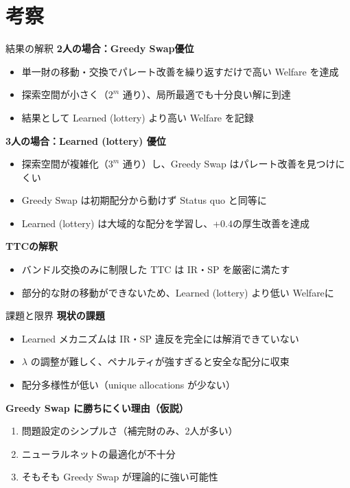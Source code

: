 \documentclass[aspectratio=169,12pt]{beamer}
\begin{document}
\section{考察}

\begin{frame}{結果の解釈}
\textbf{2人の場合：Greedy Swap優位}
\begin{itemize}
    \item 単一財の移動・交換でパレート改善を繰り返すだけで高い Welfare を達成
    \item 探索空間が小さく（$2^m$ 通り）、局所最適でも十分良い解に到達
    \item 結果として Learned (lottery) より高い Welfare を記録
\end{itemize}

\vspace{0.5cm}
\textbf{3人の場合：Learned (lottery) 優位}
\begin{itemize}
    \item 探索空間が複雑化（$3^m$ 通り）し、Greedy Swap はパレート改善を見つけにくい
    \item Greedy Swap は初期配分から動けず Status quo と同等に
    \item Learned (lottery) は大域的な配分を学習し、+0.4の厚生改善を達成
\end{itemize}

\vspace{0.5cm}
\textbf{TTCの解釈}
\begin{itemize}
    \item バンドル交換のみに制限した TTC は IR・SP を厳密に満たす
    \item 部分的な財の移動ができないため、Learned (lottery) より低い Welfareに
\end{itemize}
\end{frame}

\begin{frame}{課題と限界}
\textbf{現状の課題}
\begin{itemize}
    \item Learned メカニズムは IR・SP 違反を完全には解消できていない
    \item $\lambda$ の調整が難しく、ペナルティが強すぎると安全な配分に収束
    \item 配分多様性が低い（unique allocations が少ない）
\end{itemize}

\vspace{0.5cm}
\textbf{Greedy Swap に勝ちにくい理由（仮説）}
\begin{enumerate}
    \item 問題設定のシンプルさ（補完財のみ、2人が多い）
    \item ニューラルネットの最適化が不十分
    \item そもそも Greedy Swap が理論的に強い可能性
\end{enumerate}
\end{frame}
\end{document}
